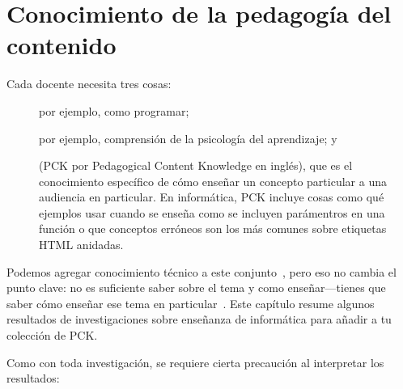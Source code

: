 \chapter{Conocimiento de la pedagogía del contenido}\label{s:pck}

Cada docente necesita tres cosas:

\begin{description}

\item[]
  por ejemplo, como programar;

\item[]
  por ejemplo, comprensión de la psicología del aprendizaje;
  y

\item[]
  (PCK por Pedagogical Content Knowledge en inglés),
  que es el conocimiento específico de cómo enseñar un concepto particular a una audiencia en particular. 
  En informática,
  PCK incluye cosas como qué ejemplos usar cuando se enseña como se incluyen parámentros en una función o que conceptos erróneos son los más comunes sobre etiquetas HTML anidadas.
\end{description}

Podemos agregar conocimiento técnico a este conjunto~\cite{Koeh2013},
pero eso no cambia el punto clave: no es suficiente saber sobre el tema y como enseñar---tienes que saber cómo enseñar ese tema en particular~\cite{Maye2004}.
Este capítulo resume algunos resultados de investigaciones sobre enseñanza de informática para añadir a tu colección de PCK.

Como con toda investigación,
se requiere cierta precaución al interpretar los resultados:

